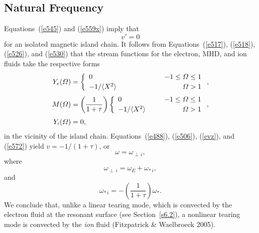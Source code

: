 \documentclass[notitlepage,12pt]{article}
\begin{document}
\subsection{Natural Frequency}\label{sphase1}
Equations~(\ref{e545}) and (\ref{e559x}) imply that 
\begin{equation}\label{evz}
v'=0 
\end{equation}
for an isolated magnetic island chain. It follows from
Equations~(\ref{e517}), (\ref{e518}), (\ref{e526}), and (\ref{e530}) that the stream functions for the
electron, MHD, and ion fluids take the respective forms
\begin{align}\label{e571}
Y_e({\mit\Omega} )&= \left\{ \begin{array}{llr} 0&~~~~~~~~~~~~~~\,&-1\leq{\mit\Omega}\leq 1\\[0.5ex]
-1/\langle X^2\rangle&&{\mit\Omega}>1\end{array}\right.,\\[0.5ex]
M({\mit\Omega} )&= \left(\frac{1}{1+\tau}\right)\left\{ \begin{array}{llr} 0&~~&-1\leq{\mit\Omega}\leq 1\\[0.5ex]
-1/\langle X^2\rangle&&{\mit\Omega}>1\end{array}\right.,\label{e572}\\[0.5ex]
Y_i({\mit\Omega}) &= 0,\label{e573}
\end{align}
in the vicinity of the island chain. Equations~(\ref{e488}), (\ref{e506}), (\ref{evz}), and (\ref{e572}) yield $v=-1/(1+\tau)$, or
\begin{equation}\label{e574}
\omega= \omega_{\perp\,i},
\end{equation}
where
\begin{equation}
\omega_{\perp\,i} = \omega_E + \omega_{\ast\,i},
\end{equation}
and
\begin{equation}
\omega_{\ast\,i} = -\left(\frac{1}{1+\tau}\right)\omega_\ast.
\end{equation}
We conclude that, unlike a linear tearing mode, which is convected by the electron fluid at the resonant surface (see Section~\ref{s6.2}), a nonlinear
tearing mode is convected by the {\em ion}\/ fluid  (Fitzpatrick \& Waelbroeck 2005). 
\end{document}
